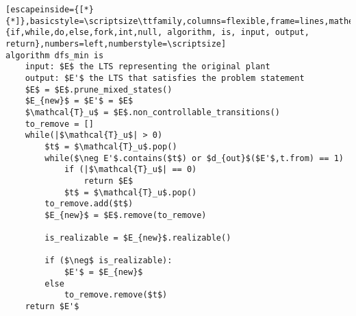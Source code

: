 \renewcommand{\ttdefault}{pcr}
\begin{lstlisting}[escapeinside={[*}{*]},basicstyle=\scriptsize\ttfamily,columns=flexible,frame=lines,mathescape=true,xleftmargin=3.0ex,keywordstyle=\textbf,morekeywords={if,while,do,else,fork,int,null, algorithm, is, input, output, return},numbers=left,numberstyle=\scriptsize]
algorithm dfs_min is
	input: $E$ the LTS representing the original plant
	output: $E'$ the LTS that satisfies the problem statement
	$E$ = $E$.prune_mixed_states()
	$E_{new}$ = $E'$ = $E$ 
	$\mathcal{T}_u$ = $E$.non_controllable_transitions() 
	to_remove = []
	while(|$\mathcal{T}_u$| > 0)
		$t$ = $\mathcal{T}_u$.pop()
		while($\neg E'$.contains($t$) or $d_{out}$($E'$,t.from) == 1)
			if (|$\mathcal{T}_u$| == 0)
				return $E$
			$t$ = $\mathcal{T}_u$.pop() 
		to_remove.add($t$)
		$E_{new}$ = $E$.remove(to_remove)
		
		is_realizable = $E_{new}$.realizable() 
		
		if ($\neg$ is_realizable):
			$E'$ = $E_{new}$
		else
			to_remove.remove($t$) 
	return $E'$  
\end{lstlisting}